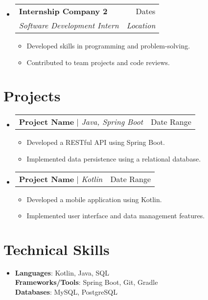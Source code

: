 \documentclass[letterpaper,11pt]{article}
\makeatletter
\newcommand{\resumeItem}[1]{
\item\small{
{#1 \vspace{-2pt}}
}
}
\newcommand{\resumeSubheading}[4]{
\vspace{-2pt}\item
\begin{tabular*}{0.97\textwidth}[t]{l@{\extracolsep{\fill}}r}
\textbf{#1} & #2 \\
\textit{\small#3} & \textit{\small #4} \\
\end{tabular*}\vspace{-7pt}
}
\newcommand{\resumeProjectHeading}[2]{
\item
\begin{tabular*}{0.97\textwidth}{l@{\extracolsep{\fill}}r}
\small#1 & #2 \\
\end{tabular*}\vspace{-7pt}
}
\newcommand{\resumeSubHeadingListStart}{\begin{itemize}[leftmargin=0.15in, label={}]}
\newcommand{\resumeSubHeadingListEnd}{\end{itemize}}
\newcommand{\resumeItemListStart}{\begin{itemize}}
\newcommand{\resumeItemListEnd}{\end{itemize}\vspace{-5pt}}
\makeatother
\begin{document}
\resumeSubHeadingListStart
\resumeSubheading{Internship Company 2}{Dates}{Software Development Intern}{Location}
\resumeItemListStart
\resumeItem{Developed skills in programming and problem-solving.}
\resumeItem{Contributed to team projects and code reviews.}
\resumeItemListEnd
\resumeSubHeadingListEnd

\section{Projects}
\resumeSubHeadingListStart
\resumeProjectHeading{\textbf{Project Name} $|$ \emph{Java, Spring Boot}}{Date Range}
\resumeItemListStart
\resumeItem{Developed a RESTful API using Spring Boot.}
\resumeItem{Implemented data persistence using a relational database.}
\resumeItemListEnd
\resumeSubHeadingListEnd

\resumeSubHeadingListStart
\resumeProjectHeading{\textbf{Project Name} $|$ \emph{Kotlin}}{Date Range}
\resumeItemListStart
\resumeItem{Developed a mobile application using Kotlin.}
\resumeItem{Implemented user interface and data management features.}
\resumeItemListEnd
\resumeSubHeadingListEnd

\section{Technical Skills} %
\begin{itemize}[leftmargin=0.15in, label={}]
\item{
\textbf{Languages}{: Kotlin, Java, SQL} \\
\textbf{Frameworks/Tools}{: Spring Boot, Git, Gradle} \\
\textbf{Databases}{: MySQL, PostgreSQL}
} \\
\end{itemize}


\end{document}
